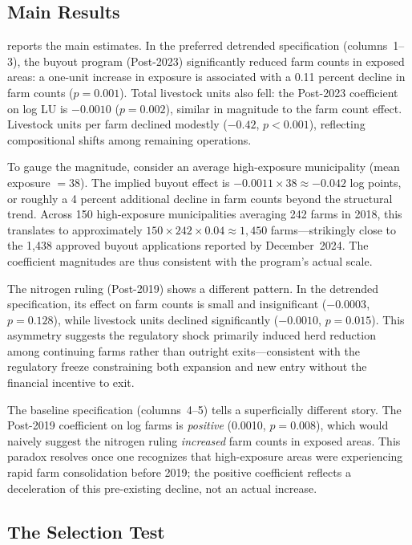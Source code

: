 \documentclass[12pt]{article}
\begin{document}
\subsection{Main Results}



 reports the main estimates. In the preferred detrended specification (columns~1--3), the buyout program (Post-2023) significantly reduced farm counts in exposed areas: a one-unit increase in exposure is associated with a 0.11 percent decline in farm counts ($p = 0.001$). Total livestock units also fell: the Post-2023 coefficient on log LU is $-0.0010$ ($p = 0.002$), similar in magnitude to the farm count effect. Livestock units per farm declined modestly ($-0.42$, $p < 0.001$), reflecting compositional shifts among remaining operations.

To gauge the magnitude, consider an average high-exposure municipality (mean exposure $= 38$). The implied buyout effect is $-0.0011 \times 38 \approx -0.042$ log points, or roughly a 4 percent additional decline in farm counts beyond the structural trend. Across 150 high-exposure municipalities averaging 242 farms in 2018, this translates to approximately $150 \times 242 \times 0.04 \approx 1{,}450$ farms---strikingly close to the 1,438 approved buyout applications reported by December~2024. The coefficient magnitudes are thus consistent with the program's actual scale.

The nitrogen ruling (Post-2019) shows a different pattern. In the detrended specification, its effect on farm counts is small and insignificant ($-0.0003$, $p = 0.128$), while livestock units declined significantly ($-0.0010$, $p = 0.015$). This asymmetry suggests the regulatory shock primarily induced herd reduction among continuing farms rather than outright exits---consistent with the regulatory freeze constraining both expansion and new entry without the financial incentive to exit.

The baseline specification (columns~4--5) tells a superficially different story. The Post-2019 coefficient on log farms is \textit{positive} (0.0010, $p = 0.008$), which would naively suggest the nitrogen ruling \textit{increased} farm counts in exposed areas. This paradox resolves once one recognizes that high-exposure areas were experiencing rapid farm consolidation before 2019; the positive coefficient reflects a deceleration of this pre-existing decline, not an actual increase.

\subsection{The Selection Test}
\end{document}
